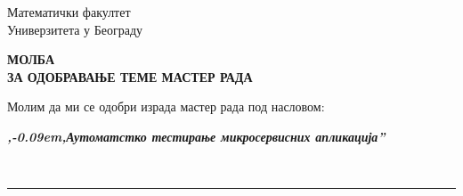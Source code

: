 \documentclass[a4paper]{article}
\def\zn{,\kern-0.09em,}
\begin{document}
\thispagestyle{empty}

\begin{flushleft}
Математички факултет\\
Универзитета у Београду
\end{flushleft}

\bigskip

\begin{center}
\textbf{МОЛБА\\
ЗА ОДОБРАВАЊЕ ТЕМЕ МАСТЕР РАДА
}\end{center}

\bigskip

\begin{flushleft}
Молим да ми се одобри израда мастер рада под насловом:
\end{flushleft}

\begin{minipage}{16.5cm}
\textbf{\textit{\zn Аутоматстко тестирање микросервисних апликација''}}
\end{minipage}\\
\rule[4mm]{17.5cm}{.05mm}
\end{document}
